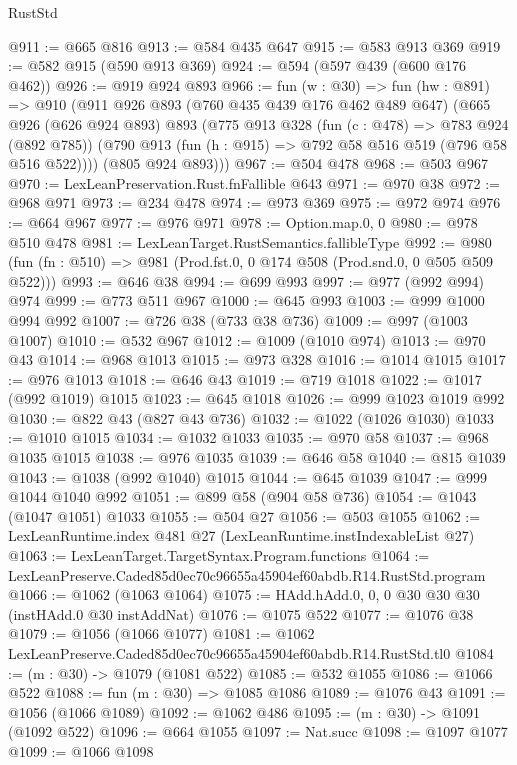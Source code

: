 \begin{lexlean}{RustStd}
\begin{coremodule}
@911 := @665 @816
@913 := @584 @435 @647
@915 := @583 @913 @369
@919 := @582 @915 (@590 @913 @369)
@924 := @594 (@597 @439 (@600 @176 @462))
@926 := @919 @924 @893
@966 := fun (w : @30) =>
  fun (hw : @891) =>
  @910
    (@911
      @926
      @893
      (@760 @435 @439 @176 @462 @489 @647)
      (@665
        @926
        (@626 @924 @893)
        @893
        (@775
          @913
          @328
          (fun (c : @478) => @783 @924 (@892 @785))
          (@790 @913 (fun (h : @915) => @792 @58 @516 @519 (@796 @58 @516 @522))))
        (@805 @924 @893)))
@967 := @504 @478
@968 := @503 @967
@970 := LexLeanPreservation.Rust.fnFallible @643
@971 := @970 @38
@972 := @968 @971
@973 := @234 @478
@974 := @973 @369
@975 := @972 @974
@976 := @664 @967
@977 := @976 @971
@978 := Option.map.{0, 0}
@980 := @978 @510 @478
@981 := LexLeanTarget.RustSemantics.fallibleType
@992 := @980 (fun (fn : @510) => @981 (Prod.fst.{0, 0} @174 @508 (Prod.snd.{0, 0} @505 @509 @522)))
@993 := @646 @38
@994 := @699 @993
@997 := @977 (@992 @994) @974
@999 := @773 @511 @967
@1000 := @645 @993
@1003 := @999 @1000 @994 @992
@1007 := @726 @38 (@733 @38 @736)
@1009 := @997 (@1003 @1007)
@1010 := @532 @967
@1012 := @1009 (@1010 @974)
@1013 := @970 @43
@1014 := @968 @1013
@1015 := @973 @328
@1016 := @1014 @1015
@1017 := @976 @1013
@1018 := @646 @43
@1019 := @719 @1018
@1022 := @1017 (@992 @1019) @1015
@1023 := @645 @1018
@1026 := @999 @1023 @1019 @992
@1030 := @822 @43 (@827 @43 @736)
@1032 := @1022 (@1026 @1030)
@1033 := @1010 @1015
@1034 := @1032 @1033
@1035 := @970 @58
@1037 := @968 @1035 @1015
@1038 := @976 @1035
@1039 := @646 @58
@1040 := @815 @1039
@1043 := @1038 (@992 @1040) @1015
@1044 := @645 @1039
@1047 := @999 @1044 @1040 @992
@1051 := @899 @58 (@904 @58 @736)
@1054 := @1043 (@1047 @1051) @1033
@1055 := @504 @27
@1056 := @503 @1055
@1062 := LexLeanRuntime.index @481 @27 (LexLeanRuntime.instIndexableList @27)
@1063 := LexLeanTarget.TargetSyntax.Program.functions
@1064 := LexLeanPreserve.Caded85d0ec70c96655a45904ef60abdb.R14.RustStd.program
@1066 := @1062 (@1063 @1064)
@1075 := HAdd.hAdd.{0, 0, 0} @30 @30 @30 (instHAdd.{0} @30 instAddNat)
@1076 := @1075 @522
@1077 := @1076 @38
@1079 := @1056 (@1066 @1077)
@1081 := @1062 LexLeanPreserve.Caded85d0ec70c96655a45904ef60abdb.R14.RustStd.tl0
@1084 := (m : @30) -> @1079 (@1081 @522)
@1085 := @532 @1055
@1086 := @1066 @522
@1088 := fun (m : @30) => @1085 @1086
@1089 := @1076 @43
@1091 := @1056 (@1066 @1089)
@1092 := @1062 @486
@1095 := (m : @30) -> @1091 (@1092 @522)
@1096 := @664 @1055
@1097 := Nat.succ
@1098 := @1097 @1077
@1099 := @1066 @1098

\end{coremodule}
\end{lexlean}
